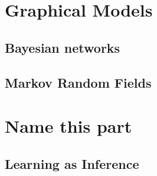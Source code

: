 \documentclass[twoside,openright,titlepage,numbers=noenddot,openany,headinclude,footinclude=true,
  cleardoublepage=empty,abstractoff,BCOR=5mm,paper=a4,fontsize=12pt]{scrreprt}
\begin{document}
\part{Graphical Models}

\chapter{Bayesian networks}



\chapter{Markov Random Fields}




\ctparttext{
  \color{black}
  \begin{center}

  \end{center}
}
\part{Name this part}

\chapter{Learning as Inference}



\clearpage
\nocite{*}


\end{document}
